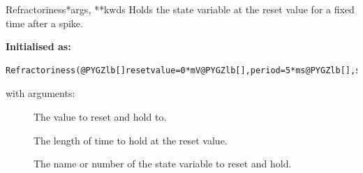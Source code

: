 \documentclass[letterpaper,10pt,english]{manual}
\begin{document}
\hypertarget{brian.Refractoriness}{}\begin{classdesc}{Refractoriness}{*args, **kwds}
Holds the state variable at the reset value for a fixed time after a spike.

\textbf{Initialised as:}

\begin{Verbatim}[commandchars=@\[\]]
Refractoriness(@PYGZlb[]resetvalue=0*mV@PYGZlb[],period=5*ms@PYGZlb[],state=0@PYGZrb[]@PYGZrb[]@PYGZrb[])
\end{Verbatim}

with arguments:
\begin{description}
\item[] \leavevmode
The value to reset and hold to.

\item[] \leavevmode
The length of time to hold at the reset value.

\item[] \leavevmode
The name or number of the state variable to reset and hold.

\end{description}
\end{classdesc}
\end{document}

